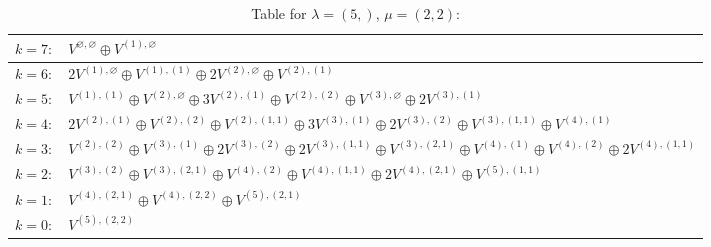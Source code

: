 \documentclass[a4paper,12pt]{article}
\begin{document}
\renewcommand{\arraystretch}{1.6} 
\begin{table}[H]
\centering
\caption{Table for $\lambda = (5,)$, $\mu = (2, 2)$:}
\begin{tabular}{|>{\centering\arraybackslash}p{15cm}|}
\hline
 $k = 7: \quad V^{\varnothing, \varnothing} \oplus V^{(1), \varnothing} $ \\ \hline
 $k = 6: \quad 2 V^{(1), \varnothing} \oplus V^{(1), (1)} \oplus 2 V^{(2), \varnothing} \oplus V^{(2), (1)} $ \\ \hline
 $k = 5: \quad V^{(1), (1)} \oplus V^{(2), \varnothing} \oplus 3 V^{(2), (1)} \oplus V^{(2), (2)} \oplus V^{(3), \varnothing} \oplus 2 V^{(3), (1)} $ \\ \hline
 $k = 4: \quad 2 V^{(2), (1)} \oplus V^{(2), (2)} \oplus V^{(2), (1, 1)} \oplus 3 V^{(3), (1)} \oplus 2 V^{(3), (2)} \oplus V^{(3), (1, 1)} \oplus V^{(4), (1)} $ \\ \hline
 $k = 3: \quad V^{(2), (2)} \oplus V^{(3), (1)} \oplus 2 V^{(3), (2)} \oplus 2 V^{(3), (1, 1)} \oplus V^{(3), (2, 1)} \oplus V^{(4), (1)} \oplus V^{(4), (2)} \oplus 2 V^{(4), (1, 1)} $ \\ \hline
 $k = 2: \quad V^{(3), (2)} \oplus V^{(3), (2, 1)} \oplus V^{(4), (2)} \oplus V^{(4), (1, 1)} \oplus 2 V^{(4), (2, 1)} \oplus V^{(5), (1, 1)} $ \\ \hline
 $k = 1: \quad V^{(4), (2, 1)} \oplus V^{(4), (2, 2)} \oplus V^{(5), (2, 1)} $ \\ \hline
 $k = 0: \quad V^{(5), (2, 2)} $ \\ \hline
\end{tabular}
\end{table}
\end{document}
